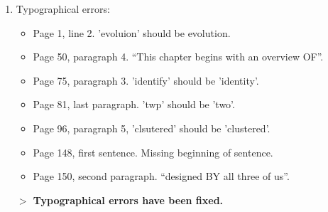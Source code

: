 \begin{enumerate}
{{\bf $>$ References have been cleaned up.}
}

\item{Typographical errors:
  \begin{itemize}
  \item{Page 1, line 2. 'evoluion' should be evolution.}
  \item{Page 50, paragraph 4. “This chapter begins with an overview
    OF”.}
  \item{Page 75, paragraph 3. 'identify' should be 'identity'.}
  \item{Page 81, last paragraph. 'twp' should be 'two'.}
  \item{Page 96, paragraph 5, 'clsutered' should be 'clustered'.}
  \item{Page 148, first sentence. Missing beginning of sentence.}
  \item{Page 150, second paragraph. “designed BY all three of us”.}
  \end{itemize}

{\bf $>$ Typographical errors have been fixed.}

}
\end{enumerate}
